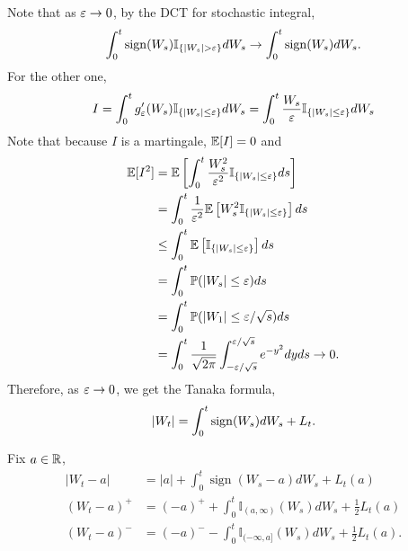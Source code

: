 Note that as $\varepsilon \rightarrow 0$, by the DCT for stochastic integral,
\begin{equation*}
    \int_0^t \operatorname{sign}(W_s)\mathbb{I}_{\left\{\left\lvert W_s\right\lvert > \varepsilon\right\}}dW_s \rightarrow \int_0^t\operatorname{sign}(W_s)dW_s.
\end{equation*}
For the other one,
\begin{equation*}
    I = \int_0^t g_\varepsilon^\prime(W_s)\mathbb{I}_{\left\{\left\lvert W_s\right\lvert \leq \varepsilon\right\}}dW_s = \int_0^t \frac{W_s}{\varepsilon}\mathbb{I}_{\left\{\left\lvert W_s\right\lvert \leq \varepsilon\right\}}dW_s 
\end{equation*}
Note that because $I$ is a martingale, $\mathbb{E}[I] = 0$ and 
\begin{align*}
    \mathbb{E}[I^2] &= \mathbb{E}\left[\int_0^t\frac{W^2_s}{\varepsilon^2}\mathbb{I}_{\left\{\left\lvert W_s\right\lvert \leq \varepsilon\right\}}ds\right] \\
    &=\int_0^t\frac{1}{\varepsilon^2}\mathbb{E}\left[W^2_s\mathbb{I}_{\left\{\left\lvert W_s\right\lvert \leq \varepsilon\right\}}\right]ds \\
    &\leq \int_0^t\mathbb{E}\left[\mathbb{I}_{\left\{\left\lvert W_s\right\lvert \leq \varepsilon\right\}}\right]ds \\
    &= \int_0^t \mathbb{P}(\left\lvert W_s\right\lvert \leq \varepsilon)ds \\
    &= \int_0^t \mathbb{P}(\left\lvert W_1\right\lvert \leq \varepsilon / \sqrt{s})ds \\
    &=  \int_0^t \frac{1}{\sqrt{2 \pi}}\int_{-\varepsilon / \sqrt{s}}^{\varepsilon / \sqrt{s}} e^{-y^2}dyds \rightarrow 0.
\end{align*}
Therefore, as $\varepsilon \rightarrow 0$, we get the Tanaka formula,
\begin{equation*}
    \left\lvert W_t\right\lvert = \int_0^t \operatorname{sign}(W_s)dW_s + L_t.
\end{equation*}
\begin{cor}
    Fix $a \in \mathbb{R}$,
    \begin{align*}
        \left|W_t-a\right| & =|a|+\int_0^t \operatorname{sign}\left(W_s-a\right) d W_s+L_t(a) \\
        \left(W_t-a\right)^{+} & =(-a)^{+}+\int_0^t \mathbb{I}_{(a, \infty)}\left(W_s\right) d W_s+\frac{1}{2} L_t(a) \\
        \left(W_t-a\right)^{-} & =(-a)^{-}-\int_0^t \mathbb{I}_{(-\infty, a]}\left(W_s\right) d W_s+\frac{1}{2} L_t(a).
    \end{align*}
\end{cor}

